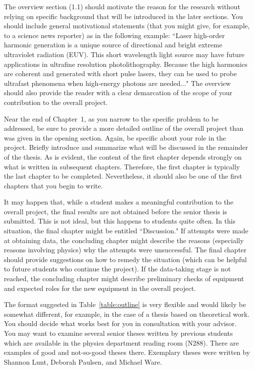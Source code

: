 The overview section (1.1) should motivate the reason for the
research without relying on specific background that will be
introduced in the later sections. You should include general
motivational statements (that you might give, for example, to a
science news reporter) as in the following example: ``Laser
high-order harmonic generation is a unique source of directional and
bright extreme ultraviolet radiation (EUV). This short wavelength
light source may have future applications in ultrafine resolution
photolithography. Because the high harmonics are coherent and
generated with short pulse lasers, they can be used to probe
ultrafast phenomena when high-energy photons are needed..." The
overview should also provide the reader with a clear demarcation of
the scope of your contribution to the overall project.

Near the end of Chapter~1, as you narrow to the specific problem to
be addressed, be sure to provide a more detailed outline of the
overall project than was given in the opening section. Again, be
specific about your role in the project. Briefly introduce and
summarize what will be discussed in the remainder of the thesis. As
is evident, the content of the first chapter depends strongly on
what is written in subsequent chapters. Therefore, the first chapter
is typically the last chapter to be completed. Nevertheless, it
should also be one of the first chapters that you begin to write.

It may happen that, while a student makes a meaningful contribution
to the overall project, the final results are not obtained before
the senior thesis is submitted. This is not ideal, but this happens
to students quite often. In this situation, the final chapter might
be entitled ``Discussion." If attempts were made at obtaining data,
the concluding chapter might describe the reasons (especially
reasons involving physics) why the attempts were unsuccessful. The
final chapter should provide suggestions on how to remedy the
situation (which can be helpful to future students who continue the
project). If the data-taking stage is not reached, the concluding
chapter might describe preliminary checks of equipment and expected
roles for the new equipment in the overall project.

The format suggested in Table~\ref{table:outline} is very flexible
and would likely be somewhat different, for example, in the case of
a thesis based on theoretical work. You should decide what works
best for you in consultation with your advisor. You may want to
examine several senior theses written by previous students which are
available in the physics department reading room (N288). There are
examples of good and not-so-good theses there. Exemplary theses were
written by Shannon Lunt, Deborah Paulsen, and Michael Ware.

